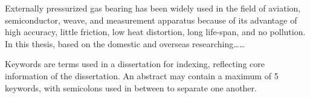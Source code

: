 \begin{eabstract}

  Externally pressurized gas bearing has been widely used in the field of aviation, semiconductor, weave, and measurement apparatus because of its advantage of high accuracy, little friction, low heat distortion, long life-span, and no pollution. In this thesis, based on the domestic and overseas researching\dots\dots

  Keywords are terms used in a dissertation for indexing, reflecting core information of the dissertation. An abstract may contain a maximum of 5 keywords, with semicolons used in between to separate one another.

\end{eabstract}
